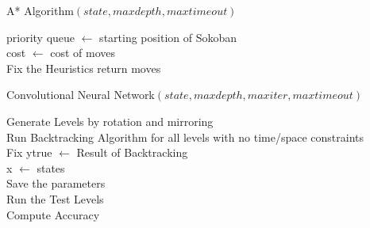 \documentclass[10pt, final]{article}
\begin{document}
\begin{algorithm}\label{A*}\small
	\caption{\small A* Algorithm$(state, maxdepth, maxtimeout)$}
	priority queue $\gets$ starting position of Sokoban \\
	cost $\gets$ cost of moves \\
	Fix the Heuristics
	return moves
\end{algorithm}

\begin{algorithm}\label{CNN}\small
	\caption{\small Convolutional Neural Network$(state, maxdepth, maxiter, maxtimeout)$}
	Generate Levels by rotation and mirroring \\
	Run Backtracking Algorithm for all levels with no time/space constraints\\
	Fix ytrue $\gets$ Result of Backtracking\\
	x $\gets$ states \\
	Save the parameters \\
	Run the Test Levels \\
	Compute Accuracy 
\end{algorithm}

\newpage
\end{document}
